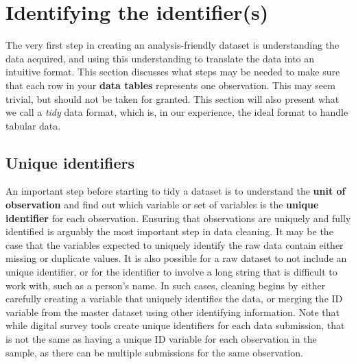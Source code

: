 \section{Identifying the identifier(s)}

The very first step in creating an analysis-friendly dataset
is understanding the data acquired,
and using this understanding to translate the data into an intuitive format.
This section discusses what steps may be needed to make sure that each row
in your \textbf{data tables}
represents one observation.
This may seem trivial, but should not be taken for granted.
This section will also present what we call a \textit{tidy} data format,
which is, in our experience, the ideal format to handle tabular data.

\subsection{Unique identifiers}

An important step before starting to tidy a dataset is
to understand the \textbf{unit of observation}
and find out which variable or set of variables is the \textbf{unique identifier}
for each observation.
Ensuring that observations are uniquely and fully identified
is arguably the most important step in data cleaning.
It may be the case that the variables expected to uniquely identify
the raw data contain either missing or duplicate values.
It is also possible for a raw dataset to not include an unique identifier,
or for the identifier to involve a long string
that is difficult to work with, such as a person's name.
In such cases, cleaning begins by either carefully creating a variable
that uniquely identifies the data,
or merging the ID variable from the master dataset
using other identifying information.
Note that while digital survey tools create unique identifiers for each data submission,
that is not the same as having a unique ID variable for each observation in the sample,
as there can be multiple submissions for the same observation.

